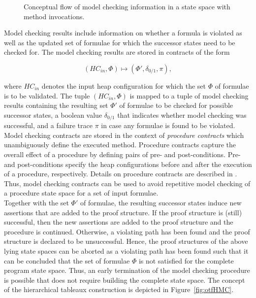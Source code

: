 \documentclass[a4paper, 12pt, twoside]{report}
\begin{document}
\begin{figure}[!h]
\begin{center}
{\begin{tikzpicture}
				\end{tikzpicture}}
			\caption{Conceptual flow of model checking information in a state space with method invocations.}\label{fig:otf_hierarchy}
		\end{center}
	\end{figure}	
	
	Model checking results include information on whether a formula is violated as well as the updated set of formulae for which the successor states need to be checked for. The model checking results are stored in contracts of the form
	
	\[(HC_{in}, \Phi) \mapsto (\Phi', \delta_{0/1}, \pi),\]
	
	where $HC_{in}$ denotes the input heap configuration for which the set $\Phi$ of formulae is to be validated. The tuple $(HC_{in}, \Phi)$ is mapped to a tuple of model checking results containing the resulting set $\Phi'$ of formulae to be checked for possible successor states, a boolean value $\delta_{0/1}$ that indicates whether model checking was successful, and a failure trace $\pi$ in case any formulae is found to be violated. Model checking contracts are stored in the context of \textit{procedure contracts} which unambiguously define the executed method. Procedure contracts capture the overall effect of a procedure by defining pairs of pre- and post-conditions. Pre- and post-conditions specify the heap configurations before and after the execution of a procedure, respectively. Details on procedure contracts are described in \cite{jansen2014generating}. Thus, model checking contracts can be used to avoid repetitive model checking of a procedure state space for a set of input formulae.\\
	
	Together with the set $\Phi'$ of formulae, the resulting successor states induce new assertions that are added to the proof structure. If the proof structure is (still) successful, then the new assertions are added to the proof structure and the procedure is continued. Otherwise, a violating path has been found and the proof structure is declared to be unsuccessful. Hence, the proof structures of the above lying state spaces can be aborted as a violating path has been found such that it can be concluded that the set of formulae $\Phi$ is not satisfied for the complete program state space. Thus, an early termination of the model checking procedure is possible that does not require building the complete state space. The concept of the hierarchical tableaux construction is depicted in Figure~\ref{fig:otfHMC}. \\
	
\end{document}
